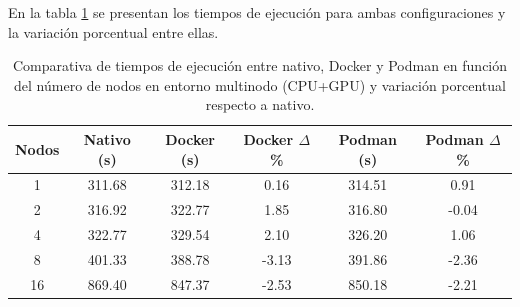 En la tabla \ref{tab:multi-node_ubuntu_container_vs_native_gpu} se presentan los tiempos de ejecución para ambas configuraciones y la variación porcentual entre ellas.

\begin{table}[ht]
    \centering
    \small
    \setlength{\tabcolsep}{4pt}
    \renewcommand{\arraystretch}{1.1}
    \begin{tabular}{|c|c|c|c|c|c|}
        \hline
        \textbf{Nodos} & \textbf{Nativo (s)} & \textbf{Docker (s)} & \textbf{Docker $\Delta$\%} & \textbf{Podman (s)} & \textbf{Podman $\Delta$\%} \\
        \hline
        1              & 311.68              & 312.18              & 0.16                       & 314.51              & 0.91                       \\
        2              & 316.92              & 322.77              & 1.85                       & 316.80              & -0.04                      \\
        4              & 322.77              & 329.54              & 2.10                       & 326.20              & 1.06                       \\
        8              & 401.33              & 388.78              & -3.13                      & 391.86              & -2.36                      \\
        16             & 869.40              & 847.37              & -2.53                      & 850.18              & -2.21                      \\
        \hline
    \end{tabular}
    \caption{Comparativa de tiempos de ejecución entre nativo, Docker y Podman en función del número de nodos en entorno multinodo (CPU+GPU) y variación porcentual respecto a nativo.}
    \label{tab:multi-node_ubuntu_container_vs_native_gpu}
\end{table}

